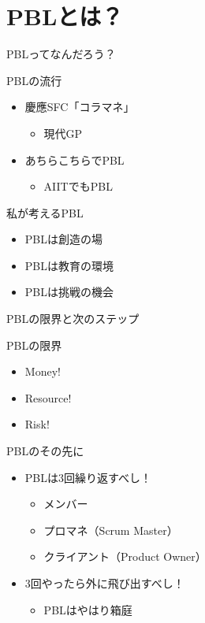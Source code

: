 \documentclass{beamer}
\begin{document}
\section{PBLとは？}
\label{sec-4}
\begin{frame}[label=sec-4-1]{PBLってなんだろう？}
\begin{block}{PBLの流行}
\begin{itemize}
\item 慶應SFC「コラマネ」
\begin{itemize}
\item 現代GP
\end{itemize}
\item あちらこちらでPBL
\begin{itemize}
\item AIITでもPBL
\end{itemize}
\end{itemize}
\end{block}
\begin{block}{私が考えるPBL}
\begin{itemize}
\item PBLは創造の場
\item PBLは教育の環境
\item PBLは挑戦の機会
\end{itemize}
\end{block}
\end{frame}
\begin{frame}[label=sec-4-2]{PBLの限界と次のステップ}
\begin{block}{PBLの限界}
\begin{itemize}
\item Money!
\item Resource!
\item Risk!
\end{itemize}
\end{block}
\begin{block}{PBLのその先に}
\begin{itemize}
\item PBLは3回繰り返すべし！
\begin{itemize}
\item メンバー
\item プロマネ（Scrum Master）
\item クライアント（Product Owner）
\end{itemize}
\item 3回やったら外に飛び出すべし！
\begin{itemize}
\item PBLはやはり箱庭
\end{itemize}
\end{itemize}
\end{block}
\end{frame}
\end{document}
